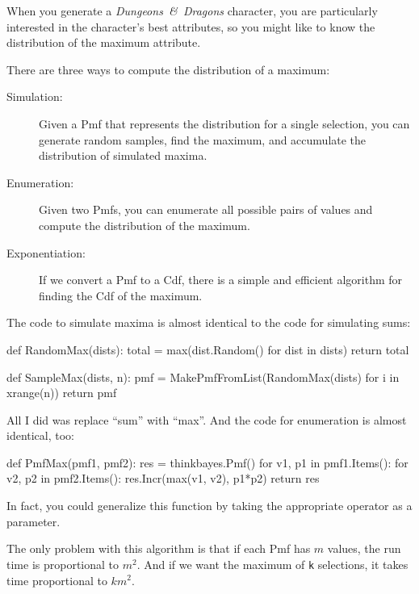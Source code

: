 \documentclass[12pt]{book}
\theoremstyle{exercise}
\begin{document}
When you generate a {\it Dungeons~\&~Dragons} character, you are
particularly interested in the character's best attributes, so
you might like to know the
distribution of the maximum attribute.

There are three ways to compute the distribution of a maximum:

\begin{description}

\item[Simulation:] Given a Pmf that represents the distribution
for a single selection, you can generate random samples, find the maximum,
and accumulate the distribution of simulated maxima.

\item[Enumeration:] Given two Pmfs, you can enumerate all possible
pairs of values and compute the distribution of the maximum.

\item[Exponentiation:] If we convert a Pmf to a Cdf, there is a simple
and efficient algorithm for finding the Cdf of the maximum.

\end{description}

The code to simulate maxima is almost identical to the code for
simulating sums:

\begin{code}
def RandomMax(dists):
    total = max(dist.Random() for dist in dists)
    return total

def SampleMax(dists, n):
    pmf = MakePmfFromList(RandomMax(dists) for i in xrange(n))
    return pmf
\end{code}

All I did was replace ``sum'' with ``max''.  And the code
for enumeration is almost identical, too:

\begin{code}
def PmfMax(pmf1, pmf2):
    res = thinkbayes.Pmf()
    for v1, p1 in pmf1.Items():
        for v2, p2 in pmf2.Items():
            res.Incr(max(v1, v2), p1*p2)
    return res
\end{code}

In fact, you could generalize this function by taking the
appropriate operator as a parameter.

The only problem with this algorithm is that if each Pmf
has $m$ values, the run time is proportional to $m^2$.
And if we want the maximum of {\tt k} selections, it takes
time proportional to $k m^2$.
\end{document}
